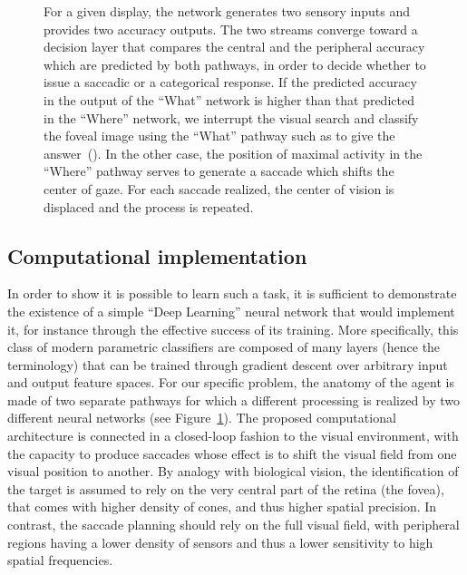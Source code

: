 \begin{figure}[t!]
{		\D
		For a given display, the network generates two sensory inputs and provides two accuracy outputs. The two streams converge toward a decision layer that compares the central and the peripheral accuracy which are predicted by both pathways, in order to decide whether to issue a saccadic or a categorical response. If the predicted accuracy in the output of the ``What'' network is higher than that predicted in the ``Where'' network,  we interrupt the visual search and classify the foveal image using the ``What'' pathway such as to give the answer~(\ANS ).  In the other case, the position of maximal activity in the ``Where'' pathway serves to generate a saccade which shifts the center of gaze. For each saccade realized, the center of vision is displaced and the process is repeated.%
		\label{fig:methods}}%
\end{figure}%
%
\subsection{Computational implementation}
%
In order to show it is possible to learn such a task, it is sufficient to demonstrate the existence of a simple ``Deep Learning'' neural network that would implement it, for instance through the effective success of its training. More specifically, this class of modern parametric classifiers are composed of many layers (hence the terminology) that can be trained through gradient descent over arbitrary input and output feature spaces. For our specific problem, the anatomy of the agent is made of two separate pathways for which a different processing is realized by two different neural networks (see Figure~\ref{fig:methods}). The proposed computational architecture is connected in a closed-loop fashion to the visual environment, with the capacity to produce saccades whose effect is to shift the visual field from one visual position to another. %
By analogy with biological vision, the identification of the target is assumed to rely on the very central part of the retina (the fovea), that comes with higher density of cones, and thus higher spatial precision. In contrast, the saccade planning should rely on the full visual field, with peripheral regions having a lower density of sensors and thus a lower sensitivity to high spatial frequencies.


